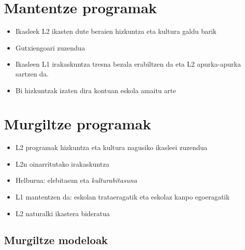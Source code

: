 \documentclass[
]{book}
\providecommand{\tightlist}{%
  \setlength{\itemsep}{0pt}\setlength{\parskip}{0pt}}
\begin{document}
\hypertarget{mantentze-programak}{%
\section{Mantentze programak}\label{mantentze-programak}}

\begin{itemize}
\tightlist
\item
  Ikasleek L2 ikasten dute beraien hizkuntza eta kultura galdu barik
\item
  Gutxiengoari zuzendua
\item
  Ikasleen L1 irakaskuntza tresna bezala erabiltzen da eta L2 apurka-apurka sartzen da.
\item
  Bi hizkuntzak izaten dira kontuan eskola amaitu arte
\end{itemize}

\hypertarget{murgiltze-programak}{%
\section{Murgiltze programak}\label{murgiltze-programak}}

\begin{itemize}
\tightlist
\item
  L2 programak hizkuntza eta kultura nagusiko ikasleei zuzendua
\item
  L2n oinarritutako irakaskuntza
\item
  Helburua: elebitasun eta \emph{kulturabitasuna}
\item
  L1 mantentzen da: eskolan trataeragatik eta eskolaz kanpo egoeragatik
\item
  L2 naturalki ikastera bideratua
\end{itemize}

\hypertarget{murgiltze-modeloak}{%
\subsection{Murgiltze modeloak}\label{murgiltze-modeloak}}
\end{document}
